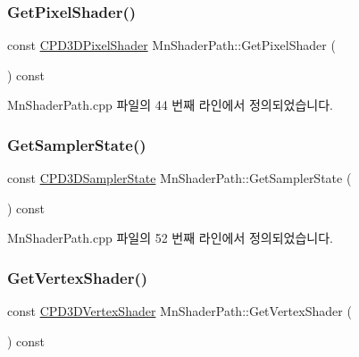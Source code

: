 \subsubsection{\texorpdfstring{Get\+Pixel\+Shader()}{GetPixelShader()}}
{\footnotesize\ttfamily const \hyperlink{namespace_m_n_l_a4d6bd408e6e19137a03728583296f12a}{C\+P\+D3\+D\+Pixel\+Shader} Mn\+Shader\+Path\+::\+Get\+Pixel\+Shader (\begin{DoxyParamCaption}{ }\end{DoxyParamCaption}) const}



Mn\+Shader\+Path.\+cpp 파일의 44 번째 라인에서 정의되었습니다.

\mbox{\label{class_m_n_l_1_1_mn_shader_path_ac8a759eec45ec72e90f9d18dc823b3b0}} 
\subsubsection{\texorpdfstring{Get\+Sampler\+State()}{GetSamplerState()}}
{\footnotesize\ttfamily const \hyperlink{namespace_m_n_l_ae0141196161ecb3d3055523077ca3aa1}{C\+P\+D3\+D\+Sampler\+State} Mn\+Shader\+Path\+::\+Get\+Sampler\+State (\begin{DoxyParamCaption}{ }\end{DoxyParamCaption}) const}



Mn\+Shader\+Path.\+cpp 파일의 52 번째 라인에서 정의되었습니다.

\mbox{\label{class_m_n_l_1_1_mn_shader_path_a1f0838e1e8c46bd0dbd55969015e4c32}} 
\subsubsection{\texorpdfstring{Get\+Vertex\+Shader()}{GetVertexShader()}}
{\footnotesize\ttfamily const \hyperlink{namespace_m_n_l_a8036d713226061c4827b537821fbf79b}{C\+P\+D3\+D\+Vertex\+Shader} Mn\+Shader\+Path\+::\+Get\+Vertex\+Shader (\begin{DoxyParamCaption}{ }\end{DoxyParamCaption}) const}




